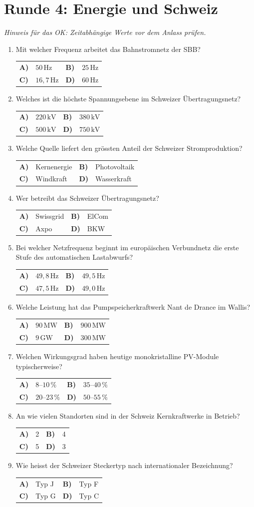 \documentclass[a4paper,11pt]{article}
\makeatletter
\newif\ifloesung
\newcommand{\loesung}[1]{\ifloesung\par\smallskip\noindent\textcolor{zwetschge}{\textbf{Lösung:} #1}\fi}
\newcommand{\mc}[6]{%
  \item #1\par\nopagebreak\smallskip
  \noindent\begin{tabularx}{\linewidth}{@{}>{\bfseries}l X >{\bfseries}l X@{}}
    A) & #2 & B) & #3 \\[0.25em]
    C) & #4 & D) & #5
  \end{tabularx}%
  \loesung{#6}}
\newcommand{\runde}[2]{\section{Runde #1: #2}}
\makeatother
\begin{document}
\runde{4}{Energie und Schweiz}
\noindent\textit{Hinweis für das OK: Zeitabhängige Werte vor dem Anlass prüfen.}
\begin{enumerate}
  \mc{Mit welcher Frequenz arbeitet das Bahnstromnetz der SBB?}
     {$50\,\mathrm{Hz}$}{$25\,\mathrm{Hz}$}{$16{,}7\,\mathrm{Hz}$}{$60\,\mathrm{Hz}$}
     {C. $16{,}7\,\mathrm{Hz}$ ($16\,\tfrac{2}{3}\,\mathrm{Hz}$) bei $15\,\mathrm{kV}$ Fahrleitungsspannung.}

  \mc{Welches ist die höchste Spannungsebene im Schweizer Übertragungsnetz?}
     {$220\,\mathrm{kV}$}{$380\,\mathrm{kV}$}{$500\,\mathrm{kV}$}{$750\,\mathrm{kV}$}
     {B. $380\,\mathrm{kV}$ (dazu die 220-kV-Ebene).}

  \mc{Welche Quelle liefert den grössten Anteil der Schweizer Stromproduktion?}
     {Kernenergie}{Photovoltaik}{Windkraft}{Wasserkraft}
     {D. Wasserkraft, deutlich über die Hälfte.}

  \mc{Wer betreibt das Schweizer Übertragungsnetz?}
     {Swissgrid}{ElCom}{Axpo}{BKW}
     {A. Swissgrid. Die ElCom ist die Regulierungsbehörde.}

  \mc{Bei welcher Netzfrequenz beginnt im europäischen Verbundnetz die erste Stufe des automatischen Lastabwurfs?}
     {$49{,}8\,\mathrm{Hz}$}{$49{,}5\,\mathrm{Hz}$}{$47{,}5\,\mathrm{Hz}$}{$49{,}0\,\mathrm{Hz}$}
     {D. Bei $49{,}0\,\mathrm{Hz}$. Bei $47{,}5\,\mathrm{Hz}$ trennen sich die Kraftwerke vom Netz.}

  \mc{Welche Leistung hat das Pumpspeicherkraftwerk Nant de Drance im Wallis?}
     {$90\,\mathrm{MW}$}{$900\,\mathrm{MW}$}{$9\,\mathrm{GW}$}{$300\,\mathrm{MW}$}
     {B. $900\,\mathrm{MW}$, etwa so viel wie ein grosses Kernkraftwerk.}

  \mc{Welchen Wirkungsgrad haben heutige monokristalline PV-Module typischerweise?}
     {$8$--$10\,\%$}{$35$--$40\,\%$}{$20$--$23\,\%$}{$50$--$55\,\%$}
     {C. Etwa $20$--$23\,\%$. Werte um $40\,\%$ erreichen nur Mehrfachzellen im Labor oder in der Raumfahrt.}

  \mc{An wie vielen Standorten sind in der Schweiz Kernkraftwerke in Betrieb?}
     {2}{4}{5}{3}
     {D. Drei Standorte: Beznau, Gösgen und Leibstadt. Zusammen sind es 4 Reaktoren, daher die Falle bei B. Mühleberg ist seit 2019 abgeschaltet.}

  \mc{Wie heisst der Schweizer Steckertyp nach internationaler Bezeichnung?}
     {Typ J}{Typ F}{Typ G}{Typ C}
     {A. Typ J (T12/T13). Typ F ist der Schuko-Stecker, Typ G der britische.}
\end{enumerate}
\end{document}
